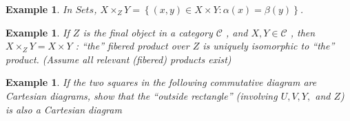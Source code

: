 \documentclass{article}
\newtheorem{example}[theorem]{Example}
\begin{document}
\begin{example}
    In $Sets$,
$X \times_Z Y = \left\{(x, y) \in X \times Y : \alpha(x) = \beta(y)\right\}$.
\end{example}
\begin{example}
    If $Z$ is the final object in a category $\mathscr C$ , and $X, Y \in\mathscr C$ , then $X \times_Z Y = X \times Y$ : “the” fibered product over $Z$ is uniquely isomorphic to “the” product. (Assume all relevant (fibered) products exist)
\end{example}
\begin{example}
    If the two squares in the following commutative diagram are Cartesian diagrams, show that the “outside rectangle” (involving $U, V, Y,$ and $Z$) is also a Cartesian diagram
    \begin{center}
        


\begin{tikzpicture}[x=0.75pt,y=0.75pt,yscale=-1,xscale=1]


\end{tikzpicture}
\end{center}
\end{example}
\end{document}
